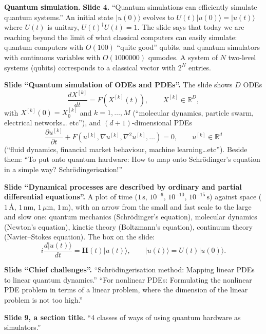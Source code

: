 \medskip\noindent
{\bf Quantum simulation.}
{\bf Slide 4.}
``Quantum simulations can efficiently
simulate quantum systems.'' An initial state
$|u(0)\rangle$ evolves to
$U(t)|u(0)\rangle=|u(t)\rangle$ where $U(t)$
is unitary, $U(t)^\dagger U(t)=1$. The slide
says that today we are reaching beyond the
limit of what classical computers can easily
simulate: quantum computers with
$O(100)$ ``quite good'' qubits, and quantum
simulators with continuous variables with
$O(1000000)$ qumodes. A system of $N$
two-level systems (qubits) corresponds to a
classical vector with $2^N$ entries.

\medskip\noindent
{\bf Slide ``Quantum simulation of ODEs and
PDEs''.}
The slide shows $D$ ODEs
$$
\frac{dX^{[k]}}{dt}=F(X^{[k]}(t)),
\qquad
X^{[k]}\in\mathbb{R}^D,
$$
with $X^{[k]}(0)=X^{[k]}_0$ and
$k=1,\dots,M$ (``molecular dynamics,
particle swarm, electrical networks\dots
etc''), and $(d+1)$-dimensional PDEs
$$
\frac{\partial u^{[k]}}{\partial t}
+F(u^{[k]},\nabla u^{[k]},
\nabla^2u^{[k]},\dots)=0,
\qquad
u^{[k]}\in\mathbb{R}^d
$$
(``fluid dynamics, financial market
behaviour, machine learning\dots etc'').
Beside them: ``To put onto quantum hardware:
How to map onto Schr\"odinger's equation in
a simple way? Schr\"odingerisation!''

\medskip\noindent
{\bf Slide ``Dynamical processes are
described by ordinary and partial
differential equations''.}
A plot of time ($1\,\mathrm{s}$, $10^{-6}$,
$10^{-10}$, $10^{-15}\,\mathrm{s}$) against
space ($1\,\text{\AA}$, $1\,\mathrm{nm}$,
$1\,\mu\mathrm{m}$, $1\,\mathrm{m}$), with
an arrow from the small and fast scale to the
large and slow one: quantum mechanics
(Schr\"odinger's equation), molecular
dynamics (Newton's equation), kinetic theory
(Boltzmann's equation), continuum theory
(Navier--Stokes equation). The box on the
slide:
$$
i\frac{d|u(t)\rangle}{dt}
=\mathbf{H}(t)|u(t)\rangle,
\qquad
|u(t)\rangle=U(t)|u(0)\rangle.
$$

\medskip\noindent
{\bf Slide ``Chief challenges''.}
``Schr\"odingerisation method: Mapping linear
PDEs to linear quantum dynamics.'' ``For
nonlinear PDEs: Formulating the nonlinear
PDE problem in terms of a linear problem,
where the dimension of the linear problem is
not too high.''

\medskip\noindent
{\bf Slide 9, a section title.}
``4 classes of ways of using quantum
hardware as simulators.''

